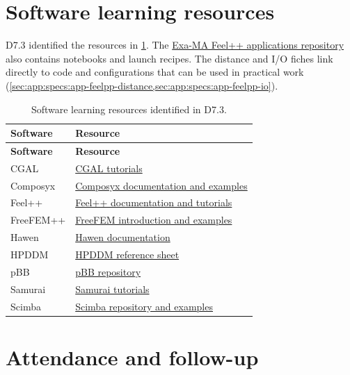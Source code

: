 \section{Software learning resources}

D7.3 identified the resources in \cref{tab:v3-training-software}.
The \href{https://github.com/numpex/apps-feelpp}{Exa-MA Feel++ applications
repository} also contains notebooks and launch recipes. The distance
and I/O fiches link directly to code and configurations that can be
used in practical work
(\cref{sec:app:specs:app-feelpp-distance,sec:app:specs:app-feelpp-io}).

\begin{longtable}{@{}>{\raggedright\arraybackslash}p{}>{\raggedright\arraybackslash}p{}@{}}
\caption{Software learning resources identified in D7.3.}
\label{tab:v3-training-software}\\
\toprule
\textbf{Software} & \textbf{Resource}\\
\midrule
\endfirsthead
\toprule
\textbf{Software} & \textbf{Resource}\\
\midrule
\endhead
CGAL & \href{https://doc.cgal.org/latest/Manual/tutorials.html}{CGAL tutorials}\\
Composyx & \href{https://composyx.gitlabpages.inria.fr/composyx/}{Composyx documentation and examples}\\
Feel++ & \href{https://docs.feelpp.org}{Feel++ documentation and tutorials}\\
FreeFEM++ & \href{https://doc.freefem.org/introduction/index.html}{FreeFEM introduction and examples}\\
Hawen & \href{https://ffaucher.gitlab.io/hawen-website/}{Hawen documentation}\\
HPDDM & \href{https://github.com/hpddm/hpddm/blob/main/doc/cheatsheet.pdf}{HPDDM reference sheet}\\
pBB & \href{https://gitlab.inria.fr/jgmys/permutationbb}{pBB repository}\\
Samurai & \href{https://hpc-math-samurai.readthedocs.io/en/latest/tutorial/}{Samurai tutorials}\\
Scimba & \href{https://gitlab.inria.fr/scimba/scimba}{Scimba repository and examples}\\
\bottomrule
\end{longtable}

\section{Attendance and follow-up}

